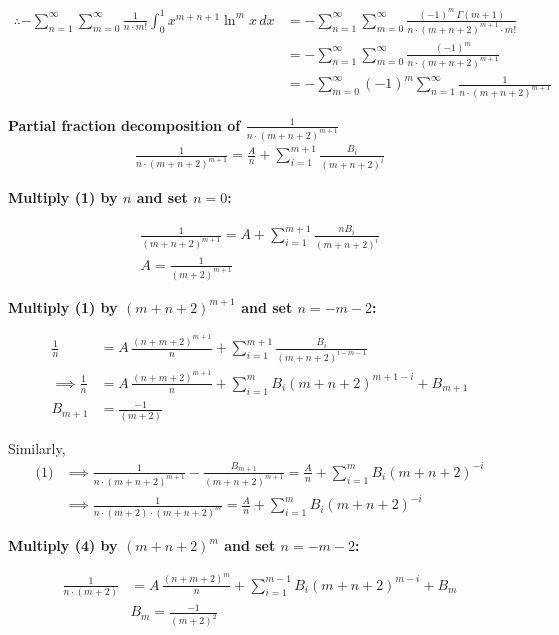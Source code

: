 \documentclass[12pt, a4paper]{article}
\begin{document}
\begin{align*}
    \therefore - \sum_{n=1}^{\infty} \sum_{m=0}^{\infty} \frac{1}{n \cdot m!} \int_{0}^{1} x^{m+n+1} \ln^m x \,dx
    &= - \sum_{n=1}^{\infty} \sum_{m=0}^{\infty} \frac{(-1)^m \, \Gamma (m+1)}{n \cdot (m+n+2)^{m+1} \cdot m!} \\
    &= - \sum_{n=1}^{\infty} \sum_{m=0}^{\infty} \frac{(-1)^m}{n \cdot (m+n+2)^{m+1}} \\
    &= - \sum_{m=0}^{\infty} (-1)^m \sum_{n=1}^{\infty} \frac{1}{n \cdot (m+n+2)^{m+1}}
\end{align*}

\noindent\textbf{Partial fraction decomposition of $\frac{1}{n \cdot (m+n+2)^{m+1}}$}
\begin{align*}
    \frac{1}{n \cdot (m+n+2)^{m+1}} = \frac{A}{n} + \sum_{i = 1}^{m+1} \frac{B_i}{(m+n+2)^i} \tag{1}
\end{align*}

\noindent\textbf{Multiply (1) by $n$ and set $n = 0$:}

\begin{align*}
    \frac{1}{(m+n+2)^{m+1}} = A + \sum_{i = 1}^{m+1} \frac{n B_i}{(m+n+2)^i} \\
    A = \frac{1}{(m+2)^{m+1}} \tag{2}
\end{align*}

\noindent\textbf{Multiply (1) by $(m+n+2)^{m+1}$ and set $n = -m-2$:}

\begin{align*}
    \frac{1}{n} &= A \, \frac{(n+m+2)^{m+1}}{n} + \sum_{i = 1}^{m+1} \frac{B_i}{(m+n+2)^{i-m-1}}\\
    \implies \frac{1}{n} &= A \, \frac{(n+m+2)^{m+1}}{n} + \sum_{i = 1}^{m} B_i(m+n+2)^{m+1-i} + B_{m+1}\\
    B_{m+1} &= \frac{-1}{(m+2)} \tag{3}
\end{align*}

Similarly,
\begin{align*}
    \text{(1)} &\implies
    \frac{1}{n \cdot (m+n+2)^{m+1}} - \frac{B_{m+1}}{(m+n+2)^{m+1}} = \frac{A}{n} + \sum_{i = 1}^{m} B_i(m+n+2)^{-i} \\
    &\implies \frac{1}{n \cdot (m+2) \cdot (m+n+2)^{m}} = \frac{A}{n} + \sum_{i = 1}^{m} B_i(m+n+2)^{-i} \tag{4}
\end{align*}

\noindent\textbf{Multiply (4) by $(m+n+2)^{m}$ and set $n = -m-2$:}

\begin{align*}
    \frac{1}{n \cdot (m+2)} &= A \, \frac{(n+m+2)^{m}}{n} + \sum_{i = 1}^{m-1} B_i(m+n+2)^{m-i} + B_m \\
    &B_{m}= \frac{-1}{(m+2)^2} \tag{5}
\end{align*}
\end{document}
